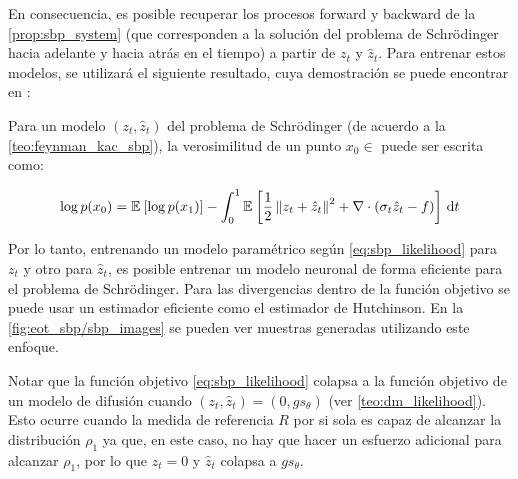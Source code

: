 En consecuencia, es posible recuperar los procesos forward y backward de la \autoref{prop:sbp_system} (que corresponden a la solución del problema de Schrödinger hacia adelante y hacia atrás en el tiempo) a partir de $z_t$ y $\hat z_t$. Para entrenar estos modelos, se utilizará el siguiente resultado, cuya demostración se puede encontrar en \cite{chen2023likelihoodtrainingschrodingerbridge}:

\begin{teo}
	\label{teo:sbp_likelihood}
	Para un modelo $(z_t,\hat z_t)$ del problema de Schrödinger (de acuerdo a la \autoref{teo:feynman_kac_sbp}), la verosimilitud de un punto $x_0\in\xspace$ puede ser escrita como:

\begin{equation}
	\label{eq:sbp_likelihood}
	\log p(x_0) = \mathbb{E}_{}\left[\log p(x_1)\right] - \int_0^1 \mathbb{E}_{}\left[\frac{1}{2}\left\lVert z_t + \hat z_t \right\rVert^2 + \nabla\cdot\left(\sigma_t \hat z_t - f\right)\right] \,\operatorname{d}\! t
\end{equation}

\end{teo}

Por lo tanto, entrenando un modelo paramétrico según \eqref{eq:sbp_likelihood} para $z_t$ y otro para $\hat z_t$, es posible entrenar un modelo neuronal de forma eficiente para el problema de Schrödinger. Para las divergencias dentro de la función objetivo se puede usar un estimador eficiente como el estimador de Hutchinson. En la \autoref{fig:eot_sbp/sbp_images} se pueden ver muestras generadas utilizando este enfoque.

Notar que la función objetivo \eqref{eq:sbp_likelihood} colapsa a la función objetivo de un modelo de difusión cuando $(z_t,\hat z_t)=(0,gs_\theta)$ (ver \autoref{teo:dm_likelihood}). Esto ocurre cuando la medida de referencia $R$ por si sola es capaz de alcanzar la distribución $\rho_1$ ya que, en este caso, no hay que hacer un esfuerzo adicional para alcanzar $\rho_1$, por lo que $z_t=0$ y $\hat z_t$ colapsa a $gs_\theta$.

